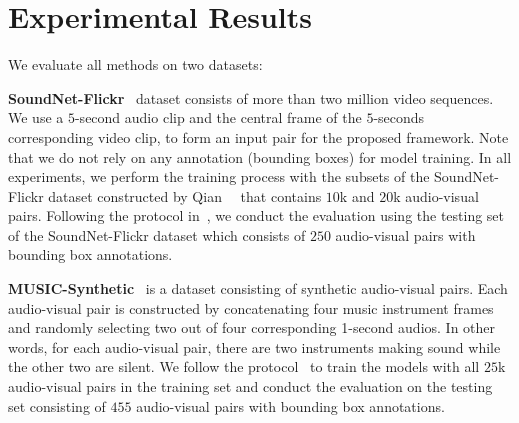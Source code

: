 
% 


\section{Experimental Results}
\label{sec:results}
\vspace{\secmargin}
 We evaluate all methods on two datasets:\begin{compactitem}[$\bullet$]
    \item\textbf{SoundNet-Flickr}~\cite{av_nips16_soundnet} dataset consists of more than two million video sequences.
% 
We use a $5$-second audio clip and the central frame of the $5$-seconds corresponding video clip, to form an input pair for the proposed framework.
% 
Note that we do not rely on any annotation (\eg bounding boxes) for model training.
%
In all experiments, we perform the training process with the subsets of the SoundNet-Flickr dataset constructed by Qian~\etal~\cite{av_eccv20_mms_loc} that contains $10$k and $20$k audio-visual pairs.
%
Following the protocol in~\cite{av_cvpr18_lls,av_eccv20_mms_loc,av_tpami20_lls}, we conduct the evaluation using the testing set of the SoundNet-Flickr dataset which consists of $250$ audio-visual pairs with bounding box annotations.
%
% 
% 
% 
 \item{\textbf{MUSIC-Synthetic}}~\cite{av_nips20_loc} is a dataset consisting of synthetic audio-visual pairs.
 Each audio-visual pair is constructed by concatenating four music instrument frames and randomly selecting two out of four corresponding 1-second audios. 
 In other words, for each audio-visual pair, there are two instruments making sound while the other two are silent.
 We follow the protocol~\cite{av_nips20_loc} to train the models with all $25$k audio-visual pairs in the training set and conduct the evaluation on the testing set consisting of $455$ audio-visual pairs with bounding box annotations.

\end{compactitem}


